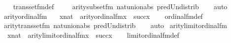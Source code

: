 \begin{isabellebody}
%
\isadelimproof
\ \ %
\endisadelimproof
%
\isatagproof
{}\isamarkupfalse%
\ transset{\isacharunderscore}{\kern0pt}fm{\isacharunderscore}{\kern0pt}def\ \isanewline
\ \ \isamarkupfalse%
\ arity{\isacharunderscore}{\kern0pt}subset{\isacharunderscore}{\kern0pt}fm\ nat{\isacharunderscore}{\kern0pt}union{\isacharunderscore}{\kern0pt}abs{}\ pred{\isacharunderscore}{\kern0pt}Un{\isacharunderscore}{\kern0pt}distrib\isanewline
\ \ \isamarkupfalse%
\ auto%
\endisatagproof
{\isafoldproof}%
%
\isadelimproof
\isanewline
%
\endisadelimproof
\isanewline
{}\isamarkupfalse%
\ arity{\isacharunderscore}{\kern0pt}ordinal{\isacharunderscore}{\kern0pt}fm\ {\isacharcolon}{\kern0pt}\isanewline
\ \ {\isachardoublequoteopen}{\isasymlbrakk}x{\isasymin}nat{\isasymrbrakk}\ {\isasymLongrightarrow}\ arity{\isacharparenleft}{\kern0pt}ordinal{\isacharunderscore}{\kern0pt}fm{\isacharparenleft}{\kern0pt}x{\isacharparenright}{\kern0pt}{\isacharparenright}{\kern0pt}\ {\isacharequal}{\kern0pt}\ succ{\isacharparenleft}{\kern0pt}x{\isacharparenright}{\kern0pt}{\isachardoublequoteclose}\isanewline
%
\isadelimproof
\ \ %
\endisadelimproof
%
\isatagproof
{}\isamarkupfalse%
\ ordinal{\isacharunderscore}{\kern0pt}fm{\isacharunderscore}{\kern0pt}def\ \isanewline
\ \ \isamarkupfalse%
\ arity{\isacharunderscore}{\kern0pt}transset{\isacharunderscore}{\kern0pt}fm\ nat{\isacharunderscore}{\kern0pt}union{\isacharunderscore}{\kern0pt}abs{}\ pred{\isacharunderscore}{\kern0pt}Un{\isacharunderscore}{\kern0pt}distrib\isanewline
\ \ \isamarkupfalse%
\ auto%
\endisatagproof
{\isafoldproof}%
%
\isadelimproof
\isanewline
%
\endisadelimproof
\isanewline
{}\isamarkupfalse%
\ arity{\isacharunderscore}{\kern0pt}limit{\isacharunderscore}{\kern0pt}ordinal{\isacharunderscore}{\kern0pt}fm\ {\isacharcolon}{\kern0pt}\isanewline
\ \ {\isachardoublequoteopen}{\isasymlbrakk}x{\isasymin}nat{\isasymrbrakk}\ {\isasymLongrightarrow}\ arity{\isacharparenleft}{\kern0pt}limit{\isacharunderscore}{\kern0pt}ordinal{\isacharunderscore}{\kern0pt}fm{\isacharparenleft}{\kern0pt}x{\isacharparenright}{\kern0pt}{\isacharparenright}{\kern0pt}\ {\isacharequal}{\kern0pt}\ succ{\isacharparenleft}{\kern0pt}x{\isacharparenright}{\kern0pt}{\isachardoublequoteclose}\isanewline
%
\isadelimproof
\ \ %
\endisadelimproof
%
\isatagproof
{}\isamarkupfalse%
\ limit{\isacharunderscore}{\kern0pt}ordinal{\isacharunderscore}{\kern0pt}fm{\isacharunderscore}{\kern0pt}def\ \isanewline
\ \ \isamarkupfalse%

\end{isabellebody}
